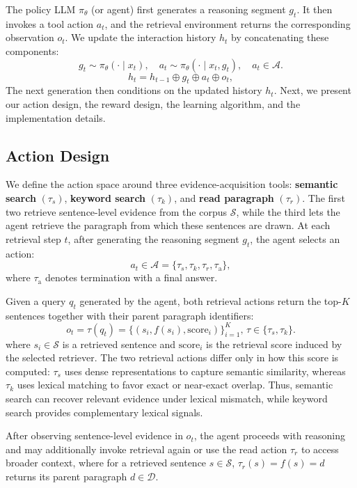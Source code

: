 \documentclass[11pt]{article}
\newcommand{\ml}[1]{\textcolor{orange}{\bf [lan: #1]}}
\begin{document}
The policy LLM \(\pi_\theta\) (or agent) first generates a reasoning segment \(g_t\).  It then invokes a tool action $a_t$, and the retrieval environment returns the corresponding observation $o_t$. We update the interaction history $h_t$ by concatenating these components:
\[
g_t \sim \pi_\theta(\cdot \mid x_t), \quad
a_t \sim \pi_\theta(\cdot \mid x_t,g_t), \quad
a_t\in\mathcal{A}.
\]
\[
h_t = h_{t-1}\oplus g_t\oplus a_t\oplus o_t,
\]
The next generation then conditions on the updated history \(h_t\). 
Next, we present our action design, the reward design, the learning algorithm, and the implementation details.

\subsection{Action Design} \label{sec:method-action-design}

We define the action space around three evidence-acquisition tools:
\textbf{semantic search} $(\tau_s)$, \textbf{keyword search} $(\tau_k)$, and \textbf{read paragraph} $(\tau_r)$.
The first two retrieve sentence-level evidence from the corpus $\mathcal{S}$, while the third lets the agent retrieve the paragraph from which these sentences are drawn.
%
%
At each retrieval step $t$, after generating the reasoning segment $g_t$, the agent selects an action:
\[
a_t \in \mathcal{A}=\{\tau_s,\tau_k,\tau_r,\tau_{\mathrm{a}}\},
\]
where $\tau_{\mathrm{a}}$ denotes termination with a final answer.

Given a query $q_t$ generated by the agent, both retrieval actions return the top-$K$ sentences together with their parent paragraph identifiers:
\[
o_t \!=\! \tau(q_t)
      \!=\! \{(s_i, f(s_i), \mathrm{score}_i)\}_{i=1}^{K},
      \, \!\tau \!\in \!\{\tau_s,\tau_k\}.
\]
where $s_i\in\mathcal{S}$ is a retrieved sentence and $\mathrm{score}_i$ is the retrieval score induced by the selected retriever.
The two retrieval actions differ only in how this score is computed:
$\tau_s$ uses dense representations to capture semantic similarity, whereas $\tau_k$ uses lexical matching to favor exact or near-exact overlap.
Thus, semantic search can recover relevant evidence under lexical mismatch, while keyword search provides complementary lexical signals.

After observing sentence-level evidence in $o_t$, the agent proceeds with reasoning and may additionally invoke retrieval again or use the read action $\tau_r$ to access broader context, where for a retrieved sentence $s\in\mathcal{S}$, $\tau_r(s)=f(s)=d$ returns its parent paragraph $d\in\mathcal{D}$.
\end{document}
